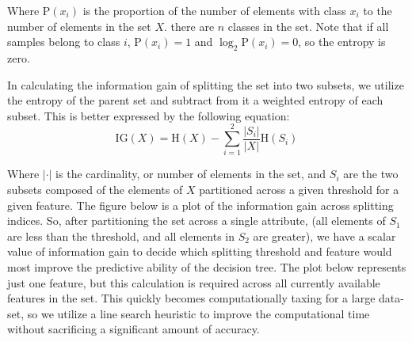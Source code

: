 Where $\mathrm{P}(x_i)$ is the proportion of the number of elements with class $x_i$ to the number of elements in the set $X$. there are $n$ classes in the set. Note that if all samples belong to class $i$, $\mathrm{P}(x_i) = 1$ and $\log_2 \mathrm{P}(x_i) = 0$, so the entropy is zero. 

In calculating the information gain of splitting the set into two subsets, we utilize the entropy of the parent set and subtract from it a weighted entropy of each subset. This is better expressed by the following equation:
%
\begin{equation}
  \mathrm{IG}(X) = \mathrm{H}(X) - \sum_{i=1}^{2} \frac{|S_i|}{|X|} \mathrm{H}(S_i)
\end{equation}

Where $|\cdot|$ is the cardinality, or number of elements in the set, and $S_i$ are the two subsets composed of the elements of $X$ partitioned across a given threshold for a given feature. The figure below is a plot of the information gain across splitting indices. So, after partitioning the set across a single attribute, (all elements of $S_1$ are less than the threshold, and all elements in $S_2$ are greater), we have a scalar value of information gain to decide which splitting threshold and feature would most improve the predictive ability of the decision tree. The plot below represents just one feature, but this calculation is required across all currently available features in the set. This quickly becomes computationally taxing for a large data-set, so we utilize a line search heuristic to improve the computational time without sacrificing a significant amount of accuracy. 

